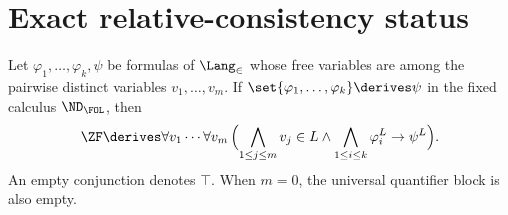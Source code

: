 \section{Exact relative-consistency status}
\label{sec:constructibility-forcing-03}

\begin{lemma}
\label{lem:relativization-derivations}
\label{def:p06-relativization-index-erratum}
Let \(\varphi_1,\ldots,\varphi_k,\psi\) be formulas of \(\Lang_{\in}\) whose
free variables are among the pairwise distinct variables
\(v_1,\ldots,v_m\).  If \(\set{\varphi_1,\ldots,\varphi_k}\derives\psi\) in
the fixed calculus \(\ND_{\FOL}\), then
\[
  \ZF\derives
  \forall v_1\cdots\forall v_m\,
  \Bigl(
    \bigwedge_{1\leq j\leq m}v_j\in L
    \land
    \bigwedge_{1\leq i\leq k}\varphi_i^{L}
    \to\psi^{L}
  \Bigr).
\]
An empty conjunction denotes \(\top\).  When \(m=0\), the universal
quantifier block is also empty.
\end{lemma}
